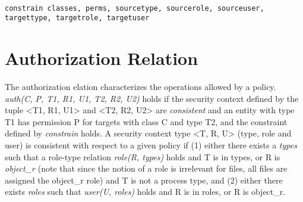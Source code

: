\lstset{language=selinux}
\begin{lstlisting}[frame=single, caption={Constrain rule},label={lst:constrainselinux}]

constrain classes, perms, sourcetype, sourcerole, sourceuser, targettype, targetrole, targetuser
\end{lstlisting}

\section{Authorization Relation}

The authorization elation characterizes the operations allowed by a policy. \emph{auth(C, P, T1, R1, U1, T2, R2, U2)} holds if the security context defined by the tuple <T1, R1, U1> and <T2, R2, U2> are \emph{consistent} and an entity with type T1 has permission P for targets with class C and type T2, and the constraint defined by \emph{constrain} holds. A security context type <T, R, U> (type, role and user) is consistent with respect to a given policy if (1) either there exists a \emph{types} such that a role-type relation \emph{role(R, types)} holds and T is in types, or R is \emph{object_r} (note that since the notion of a role is irrelevant for files, all files are assigned the object_r role) and T is not a process type, and (2) either there exists \emph{roles} such that \emph{user(U, roles)} holds and R is in roles, or R is object_r. 





